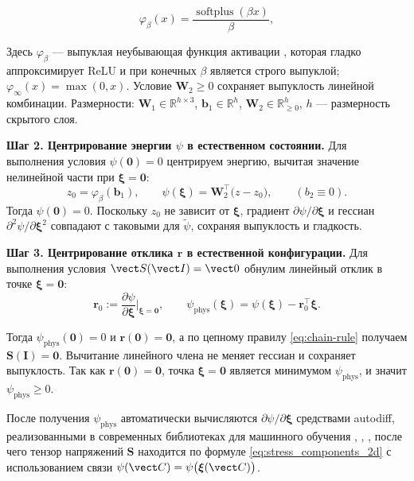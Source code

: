 \begin{equation}
  \varphi_{\beta}(x) = \frac{\operatorname{softplus}(\beta x)}{\beta},
  \label{eq:softplus_activation}
\end{equation}

Здесь $\varphi_{\beta}$ — выпуклая неубывающая функция активации \cite{dugas2001incorporating}, 
которая гладко аппроксимирует ReLU и при конечных $\beta$ является строго выпуклой; $\varphi_{\infty}(x)=\max(0,x)$.
Условие $\mathbf{W}_2\!\ge 0$ сохраняет выпуклость линейной комбинации. 
Размерности: $\mathbf{W}_1\!\in\mathbb{R}^{h\times 3}$, $\mathbf{b}_1\!\in\mathbb{R}^{h}$, 
$\mathbf{W}_2\!\in\mathbb{R}^{h}_{\ge 0}$, $h$ — размерность скрытого слоя.

\textbf{Шаг 2. Центрирование энергии $\psi$ в естественном состоянии.}
Для выполнения условия $\psi(\mathbf{0})=0$ центрируем энергию, 
вычитая значение нелинейной части при $\boldsymbol{\xi}=\mathbf{0}$:
\begin{equation}
  z_0 = \varphi_{\beta}(\mathbf{b}_1),\qquad
  \psi(\boldsymbol{\xi}) = \mathbf{W}_2^{\top}\big(z - z_0\big),\qquad (b_2 \equiv 0).
  \label{eq:center_psi}
\end{equation}
Тогда $\psi(\mathbf{0})=0$. Поскольку $z_0$ не зависит от $\boldsymbol{\xi}$, 
градиент $\partial\psi/\partial\boldsymbol{\xi}$ и гессиан $\partial^2\psi/\partial\boldsymbol{\xi}^2$ 
совпадают с таковыми для $\tilde{\psi}$, сохраняя выпуклость и гладкость.

\textbf{Шаг 3. Центрирование отклика $\mathbf{r}$ в естественной конфигурации.}
Для выполнения условия $\vect S(\vect I)=\vect 0$ обнулим линейный отклик в точке 
$\boldsymbol{\xi}=\mathbf{0}$:
\begin{equation}
  \mathbf{r}_0 := \frac{\partial \psi}{\partial \boldsymbol{\xi}}\bigg|_{\boldsymbol{\xi}=\mathbf{0}},\qquad
  \psi_{\mathrm{phys}}(\boldsymbol{\xi}) = \psi(\boldsymbol{\xi}) - \mathbf{r}_0^{\top}\boldsymbol{\xi}.
  \label{eq:phys_energy}
\end{equation}

Тогда $\psi_{\mathrm{phys}}(\mathbf{0})=0$ и $\mathbf{r}(\mathbf{0})=\mathbf{0}$, 
а по цепному правилу \eqref{eq:chain-rule} получаем $\mathbf{S}(\mathbf{I})=\mathbf{0}$. 
Вычитание линейного члена не меняет гессиан и сохраняет выпуклость. 
Так как $\mathbf{r}(\mathbf{0})=\mathbf{0}$, точка $\boldsymbol{\xi}=\mathbf{0}$ является минимумом 
$\psi_{\mathrm{phys}}$, и значит $\psi_{\mathrm{phys}}\ge 0$.

После получения $\psi_{\mathrm{phys}}$ автоматически вычисляются 
$\partial\psi/\partial\boldsymbol{\xi}$ средствами autodiff, реализованными в современных библиотеках для машинного обучения 
\cite{pytorch2019}, \cite{tensorflow2016}, \cite{jax2018}, 
после чего тензор напряжений $\mathbf{S}$ находится по формуле \eqref{eq:stress_components_2d} с 
использованием связи $\psi(\vect C)=\psi\big(\boldsymbol{\xi}(\vect C)\big)$.

